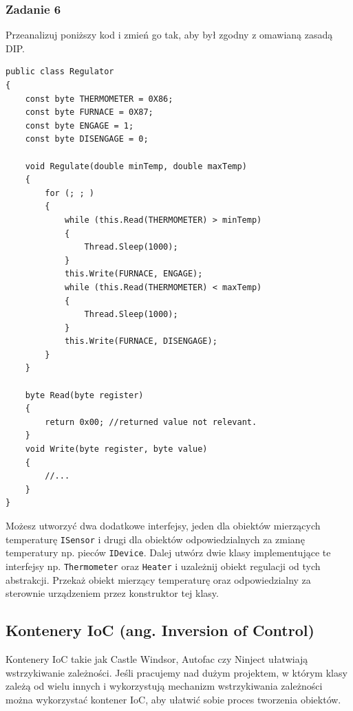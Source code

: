\subsubsection{Zadanie 6}
Przeanalizuj poniższy kod i zmień go tak, aby był zgodny z omawianą zasadą DIP.
\begin{lstlisting}
public class Regulator
{
	const byte THERMOMETER = 0X86;
	const byte FURNACE = 0X87;
	const byte ENGAGE = 1;
	const byte DISENGAGE = 0;
	
	void Regulate(double minTemp, double maxTemp)
	{
		for (; ; )
		{
			while (this.Read(THERMOMETER) > minTemp)
			{
				Thread.Sleep(1000);
			}
			this.Write(FURNACE, ENGAGE);
			while (this.Read(THERMOMETER) < maxTemp)
			{
				Thread.Sleep(1000);
			}
			this.Write(FURNACE, DISENGAGE);
		}
	}
	
	byte Read(byte register)
	{
		return 0x00; //returned value not relevant.
	}
	void Write(byte register, byte value)
	{
		//...
	}
}
\end{lstlisting}

Możesz utworzyć dwa dodatkowe interfejsy, jeden dla obiektów mierzących temperaturę \texttt{ISensor} i drugi dla obiektów odpowiedzialnych za zmianę temperatury np. pieców \texttt{IDevice}. Dalej utwórz dwie klasy implementujące te interfejsy np. \texttt{Thermometer} oraz \texttt{Heater} i uzależnij obiekt regulacji od tych abstrakcji. Przekaż obiekt mierzący temperaturę oraz odpowiedzialny za sterownie urządzeniem przez konstruktor tej klasy. 

\subsection{Kontenery IoC (ang. Inversion of Control)}
Kontenery IoC takie jak Castle Windsor, Autofac czy Ninject ułatwiają wstrzykiwanie zależności. Jeśli pracujemy nad dużym projektem, w którym klasy zależą od wielu innych i wykorzystują mechanizm wstrzykiwania zależności można wykorzystać kontener IoC, aby ułatwić sobie proces tworzenia obiektów. 

